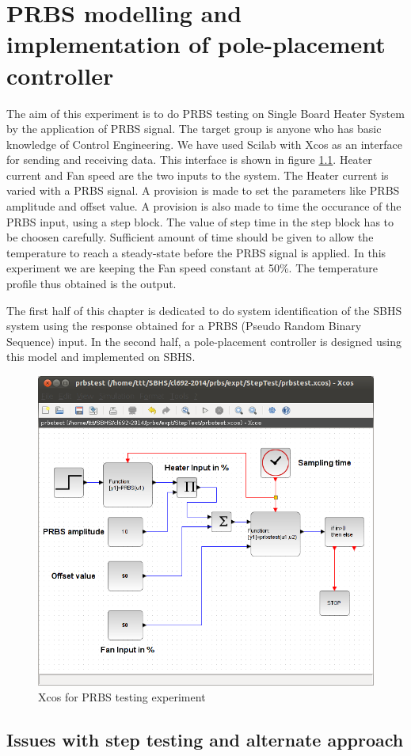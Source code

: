 \chapter{PRBS modelling and implementation of pole-placement controller}
The aim of this experiment is to do PRBS testing on Single Board Heater System by the application of PRBS signal. The target group is anyone who has basic knowledge of Control Engineering. We have used Scilab with Xcos as an interface for sending and receiving data. This interface is shown in figure \ref{prbs-xcos}. Heater current and Fan speed are the two inputs to the system. The Heater current is varied with a PRBS signal. A provision is made to set the parameters like PRBS amplitude and offset value. A provision is also made to time the occurance of the PRBS input, using a step block. The value of step time in the step block has to be choosen carefully. Sufficient amount of time should be given to allow the temperature to reach a steady-state before the PRBS signal is applied. In this experiment we are keeping the Fan speed constant at 50\%. The temperature profile thus obtained is the output.

The first half of this chapter is dedicated to do system identification of the SBHS system using the response obtained for a PRBS (Pseudo Random Binary Sequence) input. In the second half, a pole-placement controller is designed using this model and implemented on SBHS.
\begin{figure}
\centering
\includegraphics[width=0.7\linewidth]{prbs/prbs-xcos.png}
\caption{Xcos for PRBS testing experiment}
\label{prbs-xcos}
\end{figure}

\section{Issues with step testing and alternate approach}


